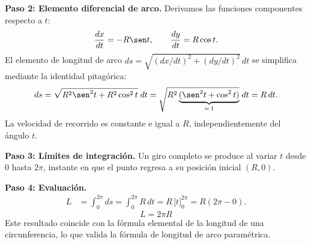 \begin{example}
\begin{myproof}
\textbf{Paso 2: Elemento diferencial de arco.}
Derivamos las funciones componentes respecto a $t$:
\[
  \frac{dx}{dt} = -R\sen t, \qquad \frac{dy}{dt} = R\cos t.
\]
El elemento de longitud de arco $ds = \sqrt{(dx/dt)^2 + (dy/dt)^2}\,dt$
se simplifica mediante la identidad pitagórica:
\[
  ds = \sqrt{R^2\sen^2 t + R^2\cos^2 t}\;dt
     = \sqrt{R^2\underbrace{(\sen^2 t + \cos^2 t)}_{=\,1}}\;dt
     = R\,dt.
\]
La velocidad de recorrido es constante e igual a $R$, independientemente
del ángulo $t$.

\textbf{Paso 3: Límites de integración.}
Un giro completo se produce al variar $t$ desde $0$ hasta $2\pi$,
instante en que el punto regresa a su posición inicial $(R, 0)$.

\textbf{Paso 4: Evaluación.}
\begin{align*}
  L &= \int_{0}^{2\pi} ds = \int_{0}^{2\pi} R\,dt
     = R\,\Big[t\Big]_{0}^{2\pi} = R(2\pi - 0).
\end{align*}
\[
  \boxed{L = 2\pi R}
\]
Este resultado coincide con la fórmula elemental de la longitud de una
circunferencia, lo que valida la fórmula de longitud de arco paramétrica.
\end{myproof}
\end{example}

